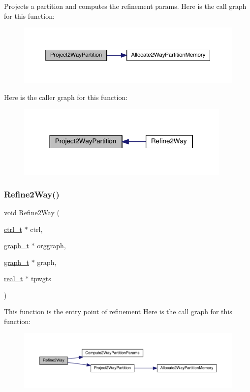 Projects a partition and computes the refinement params. Here is the call graph for this function\+:\nopagebreak
\begin{figure}[H]
\begin{center}
\leavevmode
\includegraphics[width=350pt]{a00266_a99814e73a646480f8af05e7d8bcfe4bc_cgraph}
\end{center}
\end{figure}
Here is the caller graph for this function\+:\nopagebreak
\begin{figure}[H]
\begin{center}
\leavevmode
\includegraphics[width=298pt]{a00266_a99814e73a646480f8af05e7d8bcfe4bc_icgraph}
\end{center}
\end{figure}
\mbox{\label{a00266_ab35c6c9d407568ece9d8398fb2757df8}} 
\subsubsection{\texorpdfstring{Refine2\+Way()}{Refine2Way()}}
{\footnotesize\ttfamily void Refine2\+Way (\begin{DoxyParamCaption}\item[{\hyperlink{a00742}{ctrl\+\_\+t} $\ast$}]{ctrl,  }\item[{\hyperlink{a00734}{graph\+\_\+t} $\ast$}]{orggraph,  }\item[{\hyperlink{a00734}{graph\+\_\+t} $\ast$}]{graph,  }\item[{\hyperlink{a00876_a1924a4f6907cc3833213aba1f07fcbe9}{real\+\_\+t} $\ast$}]{tpwgts }\end{DoxyParamCaption})}

This function is the entry point of refinement Here is the call graph for this function\+:\nopagebreak
\begin{figure}[H]
\begin{center}
\leavevmode
\includegraphics[width=350pt]{a00266_ab35c6c9d407568ece9d8398fb2757df8_cgraph}
\end{center}
\end{figure}
